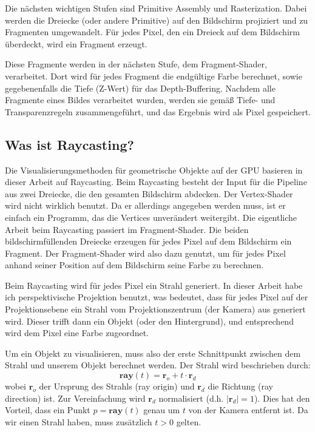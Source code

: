 \documentclass[
	ngerman,%
	accentcolor=9c,%
	ruledheaders=section,%
	class=report,%
	thesis={type=bachelor},%
	fontsize=11pt,%
	parskip=half-,%
	custommargins=true,%
	marginpar=false,%
]{tudapub}
\begin{document}
Die nächsten wichtigen Stufen sind Primitive Assembly und Rasterization. Dabei werden die Dreiecke (oder andere Primitive) auf den Bildschirm projiziert und zu Fragmenten umgewandelt. Für jedes Pixel, den ein Dreieck auf dem Bildschirm überdeckt, wird ein Fragment erzeugt. 

Diese Fragmente werden in der nächsten Stufe, dem Fragment-Shader, verarbeitet. Dort wird für jedes Fragment die endgültige Farbe berechnet, sowie gegebenenfalls die Tiefe (Z-Wert) für das Depth-Buffering. Nachdem alle Fragmente eines Bildes verarbeitet wurden, werden sie gemäß Tiefe- und Transparenzregeln zusammengeführt, und das Ergebnis wird als Pixel gespeichert.

\subsection{Was ist Raycasting? }

Die Visualisierungsmethoden für geometrische Objekte auf der GPU basieren in dieser Arbeit auf Raycasting.
Beim Raycasting besteht der Input für die Pipeline aus zwei Dreiecke, die den gesamten Bildschirm abdecken. Der Vertex-Shader wird nicht wirklich benutzt. Da er allerdings angegeben werden muss, ist er einfach ein Programm, das die Vertices unverändert weitergibt. Die eigentliche Arbeit beim Raycasting passiert im Fragment-Shader. Die beiden bildschirmfüllenden Dreiecke erzeugen für jedes Pixel auf dem Bildschirm ein Fragment. Der Fragment-Shader wird also dazu genutzt, um für jedes Pixel anhand seiner Position auf dem Bildschirm seine Farbe zu berechnen.

Beim Raycasting wird für jedes Pixel ein Strahl generiert. In dieser Arbeit habe ich perspektivische
Projektion benutzt, was bedeutet, dass für jedes Pixel auf der Projektionsebene ein Strahl
vom Projektionszentrum (der Kamera) aus generiert wird. Dieser trifft dann ein Objekt (oder
den Hintergrund), und entsprechend wird dem Pixel eine Farbe zugeordnet.


Um ein Objekt zu visualisieren, muss also der erste Schnittpunkt zwischen dem Strahl und
unserem Objekt berechnet werden.
Der Strahl wird beschrieben durch:
\[\mathbf{ray}(t)= \mathbf{r}_o + t \cdot \mathbf{r}_d \]
wobei $\mathbf{r}_o$ der Ursprung des Strahls (ray origin) und $\mathbf{r}_d$ die Richtung (ray direction) ist. Zur
Vereinfachung wird $ \mathbf{r}_d$ normalisiert (d.h. $|\mathbf{r}_d|=1$). Dies hat den Vorteil, dass ein Punkt $ p=\mathbf{ray}(t) $
genau um $t$ von der Kamera entfernt ist. Da wir einen Strahl haben, muss zusätzlich $t>0$
gelten.
    
\end{document}
